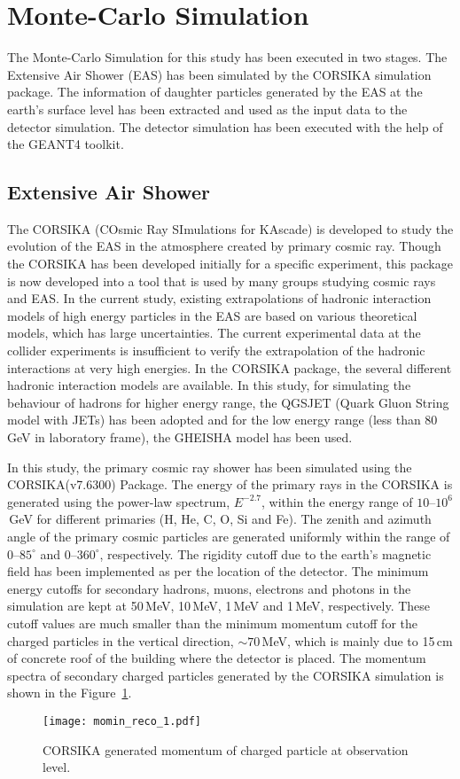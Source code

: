 \section{Monte-Carlo Simulation} \label{sec:montecarlo}
The Monte-Carlo Simulation for this study has been executed in
two stages. The Extensive Air Shower (EAS) has been simulated
by the CORSIKA simulation package\cite{corsika763}. The information
of daughter particles generated by the EAS at the earth's surface
level has been extracted and used as the input data to the detector
simulation. The detector simulation has been executed with the help
of the GEANT4 toolkit\cite{geant4}.

\subsection{Extensive Air Shower}
The CORSIKA (COsmic Ray SImulations for KAscade) is developed to study
the evolution of the EAS in the atmosphere created by primary cosmic
ray. Though the CORSIKA has been developed initially for a specific
experiment, this package is now developed into a tool that is used
by many groups studying cosmic rays and EAS.
In the current study, existing extrapolations of hadronic interaction
models of high energy particles in the EAS are based on
various theoretical models, which has large uncertainties.
The current experimental data at the collider experiments is
insufficient to verify the extrapolation of the hadronic interactions
at very high energies. In the CORSIKA package, the several different
hadronic interaction models are available. In this study, for
simulating the behaviour of hadrons for higher energy range,
the QGSJET (Quark Gluon String model with JETs)\cite{corsika763} has
been adopted and for the low energy range (less than 80\,GeV in
laboratory frame), the GHEISHA model has been used.

In this study, the primary cosmic ray shower has been simulated using
the CORSIKA(v7.6300) Package. The energy of the primary rays in the
CORSIKA is generated using the power-law spectrum, $E^{-2.7}$, within
the energy range of \mbox{$10$--$10^{6}$\,GeV} for different primaries
(H, He, C, O, Si and Fe). The zenith and azimuth angle of the primary
cosmic particles are generated uniformly within the range of
\mbox{$0$--$85^\circ$} and \mbox{$0$--$360^\circ$}, respectively. The
rigidity cutoff due to the earth's magnetic field has been implemented
as per the location of the detector. The minimum energy cutoffs for
secondary hadrons, muons, electrons and photons in the simulation are
kept at 50\,MeV, 10\,MeV, 1\,MeV and 1\,MeV, respectively. These cutoff
values are much smaller than the minimum momentum cutoff for
the charged particles in the vertical direction,
\mbox{$\sim 70$\,MeV}, which is mainly due to 15\,cm of concrete
roof of the building where the detector is placed. The momentum
spectra of secondary charged particles generated by the CORSIKA
simulation is shown in the Figure~\ref{fig:momin}.
\begin{figure}[h]
  \centering
  \texttt{[image: momin\_reco\_1.pdf]} 
  \caption{CORSIKA generated momentum of charged particle at observation level.}
  \label{fig:momin}
\end{figure}

